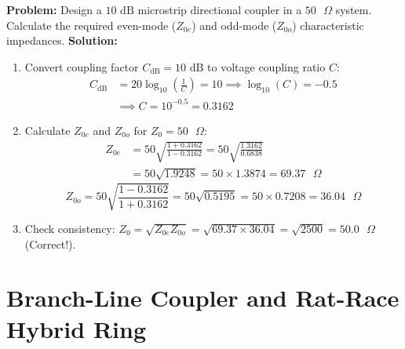 \documentclass[10pt,a4paper]{article}
\begin{document}
\begin{tcolorbox}[examplebox, title={Worked Numerical: $10\text{ dB}$ Coupled Line Design}]
  \textbf{Problem:} Design a $10\text{ dB}$ microstrip directional coupler in a $50\text{ }\Omega$ system. Calculate the required even-mode ($Z_{0e}$) and odd-mode ($Z_{0o}$) characteristic impedances.
  \tcblower
  \textbf{Solution:}
  \begin{enumerate}[label=Step \arabic*:, itemsep=4pt]
    \item Convert coupling factor $C_{\text{dB}} = 10\text{ dB}$ to voltage coupling ratio $C$:
      \begin{equation}
        \begin{aligned}
          C_{\text{dB}} &= 20 \log_{10}\left(\frac{1}{C}\right) = 10 \implies \log_{10}(C) = -0.5 \\
          &\implies C = 10^{-0.5} = 0.3162
        \end{aligned}
      \end{equation}
    \item Calculate $Z_{0e}$ and $Z_{0o}$ for $Z_0 = 50\text{ }\Omega$:
      \begin{equation}
        \begin{aligned}
          Z_{0e} &= 50 \sqrt{\frac{1 + 0.3162}{1 - 0.3162}} = 50 \sqrt{\frac{1.3162}{0.6838}} \\
          &= 50 \sqrt{1.9248} = 50 \times 1.3874 = 69.37\text{ }\Omega
        \end{aligned}
      \end{equation}
      \begin{equation}
        Z_{0o} = 50 \sqrt{\frac{1 - 0.3162}{1 + 0.3162}} = 50 \sqrt{0.5195} = 50 \times 0.7208 = 36.04\text{ }\Omega
      \end{equation}
    \item Check consistency: $Z_0 = \sqrt{Z_{0e} Z_{0o}} = \sqrt{69.37 \times 36.04} = \sqrt{2500} = 50.0\text{ }\Omega$ (Correct!).
  \end{enumerate}
\end{tcolorbox}

\section{Branch-Line Coupler and Rat-Race Hybrid Ring}
\end{document}
